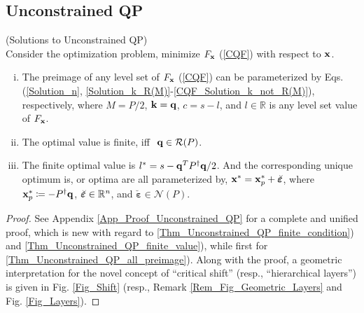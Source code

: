 \documentclass{imaman}
\newcommand{\bfx}{{\bf x}}
\newcommand{\bfq}{{\bf q}}
\newcommand{\bfk}{{\bf k}}
\newcommand{\bfvarepsilon}{{\boldsymbol \varepsilon}}
\newcommand{\real}{\mathbb{R}}
\newcommand{\calN}{{\mathcal N}}
\newcommand{\calR}{{\mathcal R}}
\newcommand{\itn}{{\it n}}
\numberwithin{equation}{section}
\begin{document}
\subsection{Unconstrained QP}
\label{Subsec_Unconstrained_QP}

\begin{theorem} (Solutions to Unconstrained QP)\\
Consider the optimization problem, minimize $F_\bfx$ {\rm(\ref{CQF})} with respect to $\bfx$.
\begin{enumerate}[i)]
\item\label{Thm_Unconstrained_QP_all_preimage} The preimage of any level set of $F_\bfx$ {\rm(\ref{CQF})} can be parameterized by Eqs. {\rm(\ref{Solution_n}}, {\rm\ref{Solution_k_R(M)}-\ref{CQF_Solution_k_not_R(M)})}, respectively, where $M=P/2$, $\bfk=\bfq$, $c=s-l$, and $l\in\real$ is any level set value of $F_\bfx$.
\item\label{Thm_Unconstrained_QP_finite_condition} The optimal value is finite, iff $~\bfq\in\calR(P)$.
\item\label{Thm_Unconstrained_QP_finite_value} The finite optimal value is $l^*=s-\bfq^T P^\dagger\bfq/2$. And the corresponding unique optimum is, or optima are all parameterized by, $\bfx^*=\bfx_p^*+\breve\bfvarepsilon$, where $\bfx_p^*\coloneqq-P^\dagger\bfq$, $\breve\bfvarepsilon\in\real^\itn$, and $\breve\bfvarepsilon\in \calN(P)$.
\end{enumerate}
\label{Thm_Unconstrained_QP}
\end{theorem}

\begin{proof}
See Appendix \ref{App_Proof_Unconstrained_QP} for a complete and unified proof, which is new with regard to \ref{Thm_Unconstrained_QP_finite_condition}) and \ref{Thm_Unconstrained_QP_finite_value}), while first for \ref{Thm_Unconstrained_QP_all_preimage}). Along with the proof, a geometric interpretation for the novel concept of ``critical shift'' (resp., ``hierarchical layers'') is given in Fig. \ref{Fig_Shift} (resp., Remark \ref{Rem_Fig_Geometric_Layers} and Fig. \ref{Fig_Layers}).
\end{proof}
\end{document}
